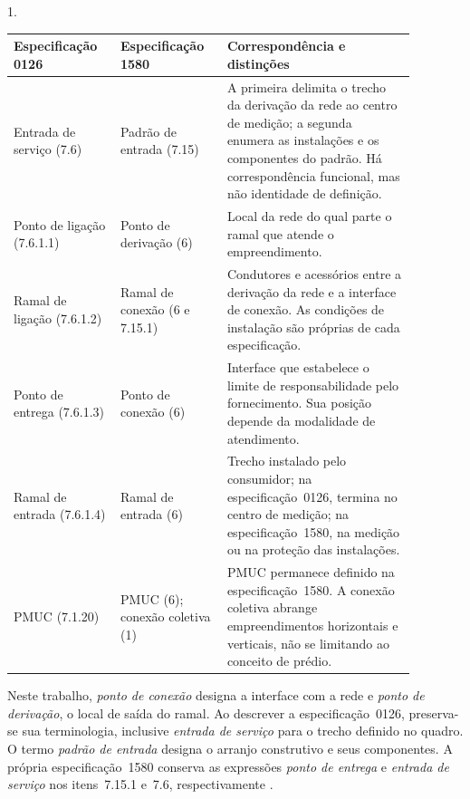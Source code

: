 \begin{quadro}[htbp]
  \centering
  \begin{Spacing}{1.}
    \caption{Correspondência terminológica entre as especificações 0126 e 1580}
    \label{qua:correspondencia-terminologica}
  \end{Spacing}
  {\small
  \renewcommand{\arraystretch}{1.2}
  \setlength{\tabcolsep}{4pt}
  \begin{tabular}{|>{\raggedright\arraybackslash}p{0.23\linewidth}|>{\raggedright\arraybackslash}p{0.23\linewidth}|>{\raggedright\arraybackslash}p{0.42\linewidth}|}
    \hline
    \textbf{Especificação 0126} & \textbf{Especificação 1580} & \textbf{Correspondência e distinções} \\\hline
    Entrada de serviço (7.6) & Padrão de entrada (7.15) & A primeira delimita o trecho da derivação da rede ao centro de medição; a segunda enumera as instalações e os componentes do padrão. Há correspondência funcional, mas não identidade de definição. \\\hline
    Ponto de ligação (7.6.1.1) & Ponto de derivação (6) & Local da rede do qual parte o ramal que atende o empreendimento. \\\hline
    Ramal de ligação (7.6.1.2) & Ramal de conexão (6 e 7.15.1) & Condutores e acessórios entre a derivação da rede e a interface de conexão. As condições de instalação são próprias de cada especificação. \\\hline
    Ponto de entrega (7.6.1.3) & Ponto de conexão (6) & Interface que estabelece o limite de responsabilidade pelo fornecimento. Sua posição depende da modalidade de atendimento. \\\hline
    Ramal de entrada (7.6.1.4) & Ramal de entrada (6) & Trecho instalado pelo consumidor; na especificação~0126, termina no centro de medição; na especificação~1580, na medição ou na proteção das instalações. \\\hline
    PMUC (7.1.20) & PMUC (6); conexão coletiva (1) & PMUC permanece definido na especificação~1580. A conexão coletiva abrange empreendimentos horizontais e verticais, não se limitando ao conceito de prédio. \\\hline
  \end{tabular}}
\end{quadro}

Neste trabalho, \emph{ponto de conexão} designa a interface com a rede e \emph{ponto de derivação}, o local de saída do ramal. Ao descrever a especificação~0126, preserva-se sua terminologia, inclusive \emph{entrada de serviço} para o trecho definido no quadro. O termo \emph{padrão de entrada} designa o arranjo construtivo e seus componentes. A própria especificação~1580 conserva as expressões \emph{ponto de entrega} e \emph{entrada de serviço} nos itens~7.15.1 e~7.6, respectivamente \cite[itens~7.15.1 e~7.6]{enel1580}.

